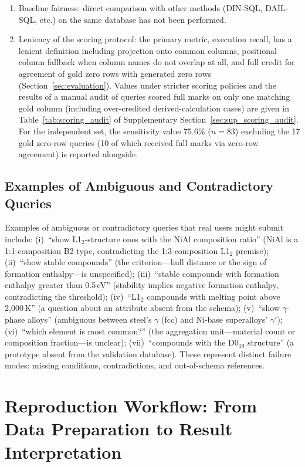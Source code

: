 \begin{enumerate}
  \item Baseline fairness:
    direct comparison with other methods (DIN-SQL, DAIL-SQL, etc.) on the same database has not been performed.
  \item Leniency of the scoring protocol:
    the primary metric, execution recall, has a lenient definition including projection onto common columns, positional column fallback when column names do not overlap at all, and full credit for agreement of gold zero rows with generated zero rows (Section~\ref{sec:evaluation}). Values under stricter scoring policies and the results of a manual audit of queries scored full marks on only one matching gold column (including over-credited derived-calculation cases) are given in Table~\ref{tab:scoring_audit} of Supplementary Section~\ref{sec:sup_scoring_audit}. For the independent set, the sensitivity value 75.6\% ($n=83$) excluding the 17 gold zero-row queries (10 of which received full marks via zero-row agreement) is reported alongside.
\end{enumerate}

\subsection{Examples of Ambiguous and Contradictory Queries}
\label{sec:sup_ambiguous}

Examples of ambiguous or contradictory queries that real users might submit include: (i)~``show L1$_2$-structure ones with the NiAl composition ratio'' (NiAl is a 1:1-composition B2 type, contradicting the 1:3-composition L1$_2$ premise); (ii)~``show stable compounds'' (the criterion---hull distance or the sign of formation enthalpy---is unspecified); (iii)~``stable compounds with formation enthalpy greater than 0.5\,eV'' (stability implies negative formation enthalpy, contradicting the threshold); (iv)~``L1$_2$ compounds with melting point above 2{,}000\,K'' (a question about an attribute absent from the schema); (v)~``show $\gamma$-phase alloys'' (ambiguous between steel's $\gamma$ (fcc) and Ni-base superalloys' $\gamma'$); (vi)~``which element is most common?'' (the aggregation unit---material count or composition fraction---is unclear); (vii)~``compounds with the D0$_{19}$ structure'' (a prototype absent from the validation database). These represent distinct failure modes: missing conditions, contradictions, and out-of-schema references.

\section{Reproduction Workflow: From Data Preparation to Result Interpretation}
\label{sec:sup_workflow}


